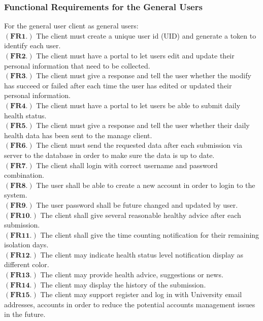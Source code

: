 \documentclass[12pt]{article}
\begin{document}
\subsubsection{Functional Requirements for the General Users}
For the general user client as general users:
\\$\mathbf{(FR1.)}$ The client must create a unique user id (UID) and generate a token to identify each user.
\\$\mathbf{(FR2.)}$ The client must have a portal to let users edit and update their personal information that need to be collected.
\\$\mathbf{(FR3.)}$ The client must give a response and tell the user whether the modify has succeed or failed after each time the user has edited or updated their personal information.
\\$\mathbf{(FR4.)}$ The client must have a portal to let users be able to submit daily health status.
\\$\mathbf{(FR5.)}$ The client must give a response and tell the user whether their daily health data has been sent to the manage client.
\\$\mathbf{(FR6.)}$ The client must send the requested data after each submission via server to the database in order to make sure the data is up to date.
\\$\mathbf{(FR7.)}$ The client shall login with correct username and password combination.
\\$\mathbf{(FR8.)}$ The user shall be able to create a new account in order to login to the system.
\\$\mathbf{(FR9.)}$ The user password shall be future changed and updated by user.
\\$\mathbf{(FR10.)}$ The client shall give several reasonable healthy advice after each submission.
\\$\mathbf{(FR11.)}$ The client shall give the time counting notification for their remaining isolation days.
\\$\mathbf{(FR12.)}$ The client may indicate health status level notification display as different color.
\\$\mathbf{(FR13.)}$ The client may provide health advice, suggestions or news.
\\$\mathbf{(FR14.)}$ The client may display the history of the submission.
\\$\mathbf{(FR15.)}$ The client may support register and log in with University email addresses, accounts in order to reduce the potential accounts management issues in the future.
\end{document}
